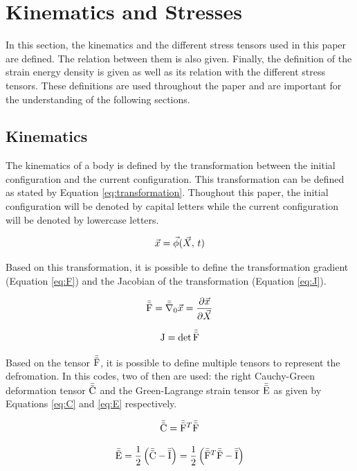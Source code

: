 \chapter{Kinematics and Stresses}

In this section, the kinematics and the different stress tensors used in this paper are defined. The relation between them is also given. Finally, the definition of the strain energy density is given as well as its relation with the different stress tensors. These definitions are used throughout the paper and are important for the understanding of the following sections.

\section{Kinematics}

The kinematics of a body is defined by the transformation between the initial configuration and the current configuration. This transformation can be defined as stated by Equation \ref{eq:transformation}. Thoughout this paper, the initial configuration will be denoted by capital letters while the current configuration will be denoted by lowercase letters.

\begin{equation} \label{eq:transformation}
    \vec{x} = \vec{\phi} (\vec{X}, \, t)
\end{equation}

Based on this transformation, it is possible to define the transformation gradient (Equation \ref{eq:F}) and the Jacobian of the transformation (Equation \ref{eq:J}).

\begin{equation} \label{eq:F}
    \bar{\bar{\mathrm{F}}} = \bar{\bar{\nabla}}_\mathrm{0} \vec{x} = \frac{\partial \vec{x}}{\partial \vec{X}}
\end{equation}

\begin{equation} \label{eq:J}
    \mathrm{J} = \det{\bar{\bar{\mathrm{F}}}}
\end{equation}

Based on the tensor $\bar{\bar{\mathrm{F}}}$, it is possible to define multiple tensors to represent the defromation. In this codes, two of then are used: the right Cauchy-Green deformation tensor $\bar{\bar{\mathrm{C}}}$ and the Green-Lagrange strain tensor $\bar{\bar{\mathrm{E}}}$ as given by Equations \ref{eq:C} and \ref{eq:E} respectively.

\begin{equation} \label{eq:C}
    \bar{\bar{\mathrm{C}}} = \bar{\bar{\mathrm{F}}}^T \bar{\bar{\mathrm{F}}}
\end{equation}

\begin{equation} \label{eq:E}
    \bar{\bar{\mathrm{E}}} = \frac{1}{2} \left(\bar{\bar{\mathrm{C}}} - \bar{\bar{\mathrm{I}}}\right) = \frac{1}{2} \left(\bar{\bar{\mathrm{F}}}^T \bar{\bar{\mathrm{F}}} - \bar{\bar{\mathrm{I}}}\right)
\end{equation}

